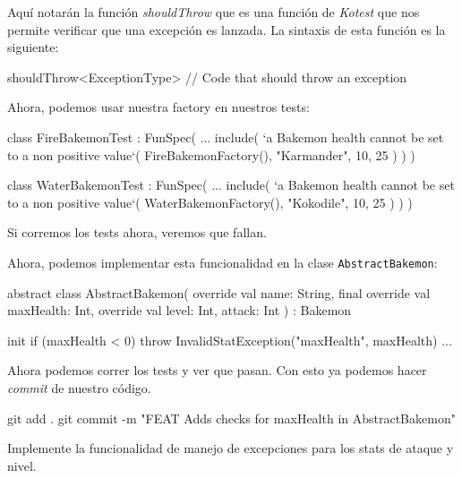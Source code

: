   Aquí notarán la función \textit{shouldThrow} que es una función de \textit{Kotest} que nos
  permite verificar que una excepción es lanzada.
  La sintaxis de esta función es la siguiente:

  \begin{kotlin}
    shouldThrow<ExceptionType> { 
      // Code that should throw an exception
    }
  \end{kotlin}

  Ahora, podemos usar nuestra factory en nuestros tests:

  \begin{kotlin}
    class FireBakemonTest : FunSpec({
      ...
      include(
        `a Bakemon health cannot be set to a non positive value`(
          FireBakemonFactory(), "Karmander", 10, 25
        )
      )
    })
  \end{kotlin}

  \begin{kotlin}
    class WaterBakemonTest : FunSpec({
      ...
      include(
        `a Bakemon health cannot be set to a non positive value`(
          WaterBakemonFactory(), "Kokodile", 10, 25
        )
      )
    })
  \end{kotlin}

  Si corremos los tests ahora, veremos que fallan.

  Ahora, podemos implementar esta funcionalidad en la clase \texttt{AbstractBakemon}:

  \begin{kotlin}
    abstract class AbstractBakemon(
      override val name: String,
      final override val maxHealth: Int,
      override val level: Int,
      attack: Int
    ) : Bakemon {
      
      init {
        if (maxHealth < 0) {
          throw InvalidStatException("maxHealth", maxHealth)
        }
      }
    ...
    }
  \end{kotlin}

  Ahora podemos correr los tests y ver que pasan.
  Con esto ya podemos hacer \textit{commit} de nuestro código.

  \begin{powershell}
    git add .
    git commit -m "FEAT Adds checks for maxHealth in AbstractBakemon"
  \end{powershell}

  \begin{exercise}
    Implemente la funcionalidad de manejo de excepciones para los stats de ataque y nivel.
  \end{exercise}
